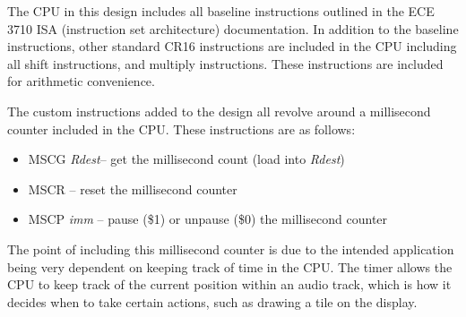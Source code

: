 \documentclass{subfile}
\begin{document}
  The CPU in this design includes all baseline instructions outlined in the ECE 3710 
  ISA (instruction set architecture) documentation.
  In addition to the baseline instructions, other standard CR16 instructions are 
  included in the CPU including all shift instructions, and multiply instructions. 
  These instructions are included for arithmetic convenience.

  The custom instructions added to the design all revolve around a millisecond counter 
  included in the CPU.
  These instructions are as follows: 
  \begin{itemize}
    \item MSCG \textit{Rdest}-- get the millisecond count (load into \textit{Rdest})
    \item MSCR -- reset the millisecond counter
    \item MSCP \textit{imm} -- pause (\$1) or unpause (\$0) the millisecond counter
  \end{itemize}

  The point of including this millisecond counter is due to the intended application being
  very dependent on keeping track of time in the CPU. 
  The timer allows the CPU to keep track of the current position within an audio track, 
  which is how it decides when to take certain actions, such as drawing a tile on 
  the display.
\end{document}
